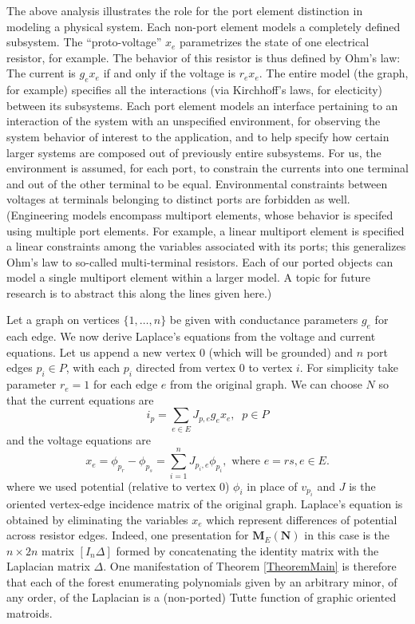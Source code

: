 \documentclass[12pt]{article}
\theoremstyle{definition}
\newcommand{\ext}[1]{\ensuremath{\mathbf{#1}}}
\begin{document}
The above analysis illustrates the role for the port element
distinction in modeling a physical system.
Each non-port 
element models a completely defined subsystem.
The ``proto-voltage\cite{SmithElec}'' $x_e$ parametrizes the
state of one electrical resistor, for example.
The behavior of this resistor is thus defined by 
Ohm's law:  
The current is $g_ex_e$ if and only if the voltage is $r_ex_e$.
The entire model (the graph, for example) specifies all the interactions 
(via Kirchhoff's laws, for electicity) between
its subsystems.
Each port element models an 
interface pertaining to an interaction 
of the system with an unspecified environment, for observing the system
behavior of interest to the application, and to help specify how 
certain larger systems are composed out of 
previously entire 
subsystems.  
For us, the environment
is assumed, for each port,
to constrain the currents into one terminal and out of the other
terminal to be equal. Environmental constraints between
voltages at terminals belonging to distinct ports are forbidden as well.
(Engineering models encompass multiport elements, whose
behavior is specifed using multiple port elements.  
For example, a linear multiport element is specified a linear
constraints among the variables associated with its ports; this generalizes
Ohm's law to so-called multi-terminal resistors.  
Each of our
ported objects 
can model a single multiport element
within a larger model.
A topic for 
future research is to abstract this along the lines given here.)

Let a graph on vertices $\{1,\ldots, n\}$ be given with conductance parameters 
$g_e$ for each edge.  
We now derive Laplace's equations from the voltage and current equations.
Let us
append a new vertex $0$ (which will be grounded) and 
$n$ port edges $p_i\in P$, with
each $p_i$ directed from vertex $0$ to vertex $i$.  For simplicity take
parameter $r_e=1$ for each edge $e$ from the original graph.  We can choose
$N$ so that the current equations are 
\[
i_p = \sum_{e\in E}J_{p,e}g_ex_e,\;\;p\in P
\]
and the voltage equations are
\[
x_e = \phi_{p_r} - \phi_{p_s} = \sum_{i=1}^n J_{p_i,e} \phi_{p_i},
\text{ where }e=rs, e\in E.
\]
where we used potential (relative to vertex $0$) $\phi_i$ in place of 
$v_{p_i}$ and $J$ is the oriented vertex-edge incidence matrix of the original
graph.  Laplace's equation is obtained by eliminating 
the variables $x_e$ which represent differences of potential across
resistor edges.  Indeed, one presentation for 
$\ext{M}_E(\ext{N})$ in this case is the $n\times 2n$ matrix
$[I_n \Delta]$ formed by concatenating the identity matrix with
the Laplacian matrix $\Delta$.  One manifestation of Theorem 
\ref{TheoremMain} is therefore that each of the forest enumerating
polynomials given by an arbitrary minor, of any order, of the Laplacian
is a (non-ported) Tutte function of graphic oriented matroids.
\end{document}
